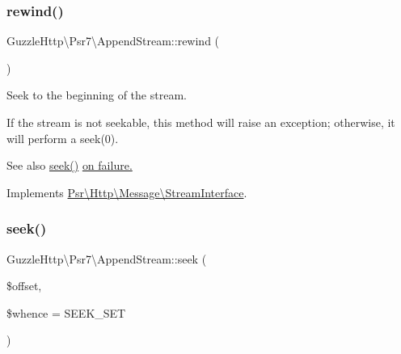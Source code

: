\mbox{\label{classGuzzleHttp_1_1Psr7_1_1AppendStream_a39b5d3ea1bcfedcffa3c0210aacb1ae2}} 
\subsubsection{\texorpdfstring{rewind()}{rewind()}}
{\footnotesize\ttfamily Guzzle\+Http\textbackslash{}\+Psr7\textbackslash{}\+Append\+Stream\+::rewind (\begin{DoxyParamCaption}{ }\end{DoxyParamCaption})}

Seek to the beginning of the stream.

If the stream is not seekable, this method will raise an exception; otherwise, it will perform a seek(0).

\begin{DoxySeeAlso}{See also}
\hyperlink{classGuzzleHttp_1_1Psr7_1_1AppendStream_a12cffae90d6bbee5c8ceecc0b27f9a43}{seek()} \hyperlink{}{on failure. }
\end{DoxySeeAlso}


Implements \hyperlink{interfacePsr_1_1Http_1_1Message_1_1StreamInterface_a48721ef4d5097250a3f94515938393c9}{Psr\textbackslash{}\+Http\textbackslash{}\+Message\textbackslash{}\+Stream\+Interface}.

\mbox{\label{classGuzzleHttp_1_1Psr7_1_1AppendStream_a12cffae90d6bbee5c8ceecc0b27f9a43}} 
\subsubsection{\texorpdfstring{seek()}{seek()}}
{\footnotesize\ttfamily Guzzle\+Http\textbackslash{}\+Psr7\textbackslash{}\+Append\+Stream\+::seek (\begin{DoxyParamCaption}\item[{}]{\$offset,  }\item[{}]{\$whence = {\ttfamily SEEK\+\_\+SET} }\end{DoxyParamCaption})}

